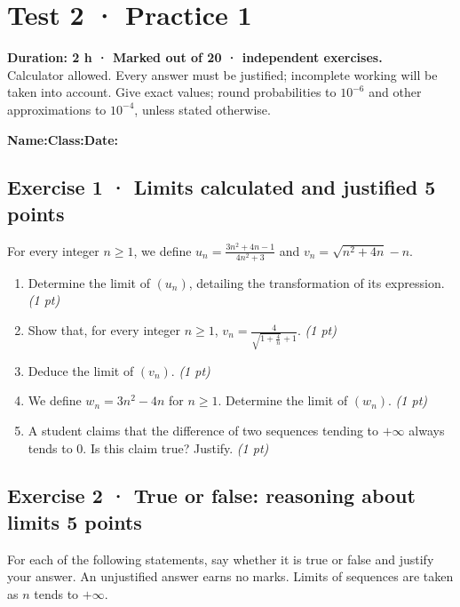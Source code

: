 \mxnewpage{}\label{sujet:2-1}

\section*{Test 2 · Practice 1}


\textbf{Duration: 2 h · Marked out of 20 ·  independent exercises.}\\Calculator allowed. Every answer must be justified; incomplete working will be taken into account. Give exact values; round probabilities to $10^{-6}$ and other approximations to $10^{-4}$, unless stated otherwise.

\smallskip\textbf{Name:}\enspace\dotfill\quad\textbf{Class:}\enspace\dotfill\quad\textbf{Date:}\enspace\dotfill

\subsection*{Exercise 1 · Limits calculated and justified \hfill 5 points}For every integer $n\ge1$, we define $u_n=\frac{3n^2+4n-1}{4n^2+3}$ and $v_n=\sqrt{n^2+4n}-n$.

\begin{enumerate}

\item Determine the limit of $(u_n)$, detailing the transformation of its expression. \hfill\textit{(1 pt)}

\item Show that, for every integer $n\ge1$, $v_n=\frac{4}{\sqrt{1+\frac{4}n}+1}$. \hfill\textit{(1 pt)}

\item Deduce the limit of $(v_n)$. \hfill\textit{(1 pt)}

\item We define $w_n=3n^2-4n$ for $n\ge1$. Determine the limit of $(w_n)$. \hfill\textit{(1 pt)}

\item A student claims that the difference of two sequences tending to $+\infty$ always tends to $0$. Is this claim true? Justify. \hfill\textit{(1 pt)}

\end{enumerate}

\subsection*{Exercise 2 · True or false: reasoning about limits \hfill 5 points}For each of the following statements, say whether it is true or false and justify your answer. An unjustified answer earns no marks. Limits of sequences are taken as $n$ tends to $+\infty$.

